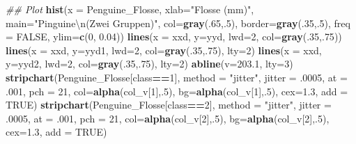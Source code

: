 \documentclass[
  ngerman,
]{book}
\newenvironment{Shaded}{\begin{snugshade}}{\end{snugshade}}
\newcommand{\CharTok}[1]{\textcolor[rgb]{0.31,0.60,0.02}{#1}}
\newcommand{\CommentTok}[1]{\textcolor[rgb]{0.56,0.35,0.01}{\textit{#1}}}
\newcommand{\DataTypeTok}[1]{\textcolor[rgb]{0.13,0.29,0.53}{#1}}
\newcommand{\DecValTok}[1]{\textcolor[rgb]{0.00,0.00,0.81}{#1}}
\newcommand{\FloatTok}[1]{\textcolor[rgb]{0.00,0.00,0.81}{#1}}
\newcommand{\KeywordTok}[1]{\textcolor[rgb]{0.13,0.29,0.53}{\textbf{#1}}}
\newcommand{\NormalTok}[1]{#1}
\newcommand{\OperatorTok}[1]{\textcolor[rgb]{0.81,0.36,0.00}{\textbf{#1}}}
\newcommand{\OtherTok}[1]{\textcolor[rgb]{0.56,0.35,0.01}{#1}}
\newcommand{\StringTok}[1]{\textcolor[rgb]{0.31,0.60,0.02}{#1}}
\begin{document}
\begin{Shaded}
\begin{Highlighting}[]
\CommentTok{## Plot}
\KeywordTok{hist}\NormalTok{(}\DataTypeTok{x =}\NormalTok{ Penguine_Flosse, }\DataTypeTok{xlab=}\StringTok{"Flosse (mm)"}\NormalTok{, }\DataTypeTok{main=}\StringTok{"Pinguine}\CharTok{\textbackslash{}n}\StringTok{(Zwei Gruppen)"}\NormalTok{,}
     \DataTypeTok{col=}\KeywordTok{gray}\NormalTok{(.}\DecValTok{65}\NormalTok{,.}\DecValTok{5}\NormalTok{), }\DataTypeTok{border=}\KeywordTok{gray}\NormalTok{(.}\DecValTok{35}\NormalTok{,.}\DecValTok{5}\NormalTok{), }\DataTypeTok{freq =} \OtherTok{FALSE}\NormalTok{, }\DataTypeTok{ylim=}\KeywordTok{c}\NormalTok{(}\DecValTok{0}\NormalTok{, }\FloatTok{0.04}\NormalTok{))}
\KeywordTok{lines}\NormalTok{(}\DataTypeTok{x =}\NormalTok{ xxd, }\DataTypeTok{y=}\NormalTok{yyd, }\DataTypeTok{lwd=}\DecValTok{2}\NormalTok{, }\DataTypeTok{col=}\KeywordTok{gray}\NormalTok{(.}\DecValTok{35}\NormalTok{,.}\DecValTok{75}\NormalTok{))}
\KeywordTok{lines}\NormalTok{(}\DataTypeTok{x =}\NormalTok{ xxd, }\DataTypeTok{y=}\NormalTok{yyd1, }\DataTypeTok{lwd=}\DecValTok{2}\NormalTok{, }\DataTypeTok{col=}\KeywordTok{gray}\NormalTok{(.}\DecValTok{35}\NormalTok{,.}\DecValTok{75}\NormalTok{), }\DataTypeTok{lty=}\DecValTok{2}\NormalTok{)}
\KeywordTok{lines}\NormalTok{(}\DataTypeTok{x =}\NormalTok{ xxd, }\DataTypeTok{y=}\NormalTok{yyd2, }\DataTypeTok{lwd=}\DecValTok{2}\NormalTok{, }\DataTypeTok{col=}\KeywordTok{gray}\NormalTok{(.}\DecValTok{35}\NormalTok{,.}\DecValTok{75}\NormalTok{), }\DataTypeTok{lty=}\DecValTok{2}\NormalTok{)}
\KeywordTok{abline}\NormalTok{(}\DataTypeTok{v=}\FloatTok{203.1}\NormalTok{, }\DataTypeTok{lty=}\DecValTok{3}\NormalTok{)}
\KeywordTok{stripchart}\NormalTok{(Penguine_Flosse[class}\OperatorTok{==}\DecValTok{1}\NormalTok{], }\DataTypeTok{method =} \StringTok{"jitter"}\NormalTok{, }\DataTypeTok{jitter =} \FloatTok{.0005}\NormalTok{, }\DataTypeTok{at =} \FloatTok{.001}\NormalTok{,}
           \DataTypeTok{pch =} \DecValTok{21}\NormalTok{, }\DataTypeTok{col=}\KeywordTok{alpha}\NormalTok{(col_v[}\DecValTok{1}\NormalTok{],.}\DecValTok{5}\NormalTok{), }\DataTypeTok{bg=}\KeywordTok{alpha}\NormalTok{(col_v[}\DecValTok{1}\NormalTok{],.}\DecValTok{5}\NormalTok{), }\DataTypeTok{cex=}\FloatTok{1.3}\NormalTok{, }\DataTypeTok{add =} \OtherTok{TRUE}\NormalTok{)}
\KeywordTok{stripchart}\NormalTok{(Penguine_Flosse[class}\OperatorTok{==}\DecValTok{2}\NormalTok{], }\DataTypeTok{method =} \StringTok{"jitter"}\NormalTok{, }\DataTypeTok{jitter =} \FloatTok{.0005}\NormalTok{, }\DataTypeTok{at =} \FloatTok{.001}\NormalTok{,}
           \DataTypeTok{pch =} \DecValTok{21}\NormalTok{, }\DataTypeTok{col=}\KeywordTok{alpha}\NormalTok{(col_v[}\DecValTok{2}\NormalTok{],.}\DecValTok{5}\NormalTok{), }\DataTypeTok{bg=}\KeywordTok{alpha}\NormalTok{(col_v[}\DecValTok{2}\NormalTok{],.}\DecValTok{5}\NormalTok{), }\DataTypeTok{cex=}\FloatTok{1.3}\NormalTok{, }\DataTypeTok{add =} \OtherTok{TRUE}\NormalTok{)}
\end{Highlighting}
\end{Shaded}
\end{document}
